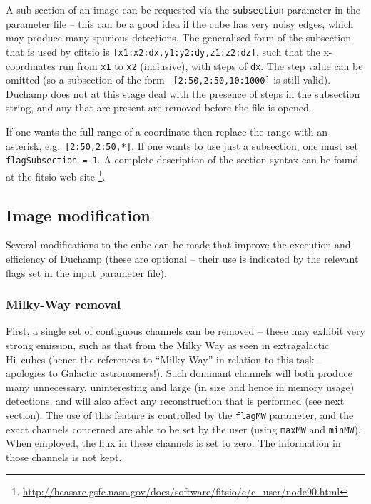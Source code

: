 \documentclass[12pt,a4paper]{article}
\newcommand{\eg}{e.g.\ }
\newcommand{\hi}{H{\sc i}}
\begin{document}
A sub-section of an image can be requested via the {\tt subsection}
parameter in the parameter file -- this can be a good idea if the cube
has very noisy edges, which may produce many spurious detections. The
generalised form of the subsection that is used by {\sc cfitsio} is
{\tt [x1:x2:dx,y1:y2:dy,z1:z2:dz]}, such that the x-coordinates run
from {\tt x1} to {\tt x2} (inclusive), with steps of {\tt dx}. The
step value can be omitted (so a subsection of the form {\tt
[2:50,2:50,10:1000]} is still valid). Duchamp does not at this stage
deal with the presence of steps in the subsection string, and any that
are present are removed before the file is opened.

If one wants the full range of a coordinate then replace the range
with an asterisk, \eg {\tt [2:50,2:50,*]}. If one wants to use just a
subsection, one must set {\tt flagSubsection = 1}. A complete
description of the section syntax can be found at the {\sc fitsio} web
site
\footnote{
\href{http://heasarc.gsfc.nasa.gov/docs/software/fitsio/c/c\_user/node90.html}%
{http://heasarc.gsfc.nasa.gov/docs/software/fitsio/c/c\_user/node90.html}}.

\subsection{Image modification}
\label{sec-modify}

Several modifications to the cube can be made that improve the
execution and efficiency of Duchamp (these are optional -- their
use is indicated by the relevant flags set in the input parameter
file).

\subsubsection{Milky-Way removal}

First, a single set of contiguous channels can be removed -- these may
exhibit very strong emission, such as that from the Milky Way as seen
in extragalactic \hi\ cubes (hence the references to ``Milky Way'' in
relation to this task -- apologies to Galactic astronomers!). Such
dominant channels will both produce many unnecessary, uninteresting
and large (in size and hence in memory usage) detections, and will
also affect any reconstruction that is performed (see next
section). The use of this feature is controlled by the {\tt flagMW}
parameter, and the exact channels concerned are able to be set by the
user (using {\tt maxMW} and {\tt minMW}). When employed, the flux in
these channels is set to zero. The information in those channels is
not kept.
\end{document}
